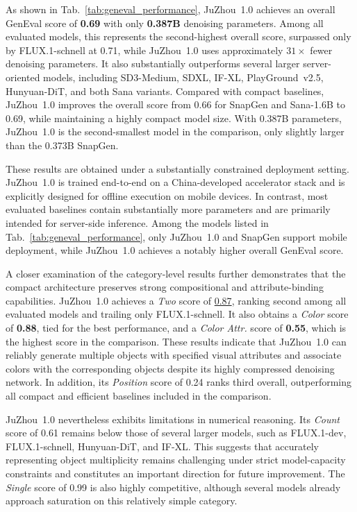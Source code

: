 As shown in Tab.~\ref{tab:geneval_performance}, JuZhou~1.0 achieves an overall GenEval score of \textbf{0.69} with only \textbf{0.387B} denoising parameters. Among all evaluated models, this represents the second-highest overall score, surpassed only by FLUX.1-schnell at 0.71, while JuZhou~1.0 uses approximately $31\times$ fewer denoising parameters. It also substantially outperforms several larger server-oriented models, including SD3-Medium, SDXL, IF-XL, PlayGround~v2.5, Hunyuan-DiT, and both Sana variants. Compared with compact baselines, JuZhou~1.0 improves the overall score from 0.66 for SnapGen and Sana-1.6B to 0.69, while maintaining a highly compact model size. With 0.387B parameters, JuZhou~1.0 is the second-smallest model in the comparison, only slightly larger than the 0.373B SnapGen.

These results are obtained under a substantially constrained deployment setting. JuZhou~1.0 is trained end-to-end on a China-developed accelerator stack and is explicitly designed for offline execution on mobile devices. In contrast, most evaluated baselines contain substantially more parameters and are primarily intended for server-side inference. Among the models listed in Tab.~\ref{tab:geneval_performance}, only JuZhou~1.0 and SnapGen support mobile deployment, while JuZhou~1.0 achieves a notably higher overall GenEval score.

A closer examination of the category-level results further demonstrates that the compact architecture preserves strong compositional and attribute-binding capabilities. JuZhou~1.0 achieves a \textit{Two} score of \underline{0.87}, ranking second among all evaluated models and trailing only FLUX.1-schnell. It also obtains a \textit{Color} score of \textbf{0.88}, tied for the best performance, and a \textit{Color Attr.} score of \textbf{0.55}, which is the highest score in the comparison. These results indicate that JuZhou~1.0 can reliably generate multiple objects with specified visual attributes and associate colors with the corresponding objects despite its highly compressed denoising network. In addition, its \textit{Position} score of 0.24 ranks third overall, outperforming all compact and efficient baselines included in the comparison.

JuZhou~1.0 nevertheless exhibits limitations in numerical reasoning. Its \textit{Count} score of 0.61 remains below those of several larger models, such as FLUX.1-dev, FLUX.1-schnell, Hunyuan-DiT, and IF-XL. This suggests that accurately representing object multiplicity remains challenging under strict model-capacity constraints and constitutes an important direction for future improvement. The \textit{Single} score of 0.99 is also highly competitive, although several models already approach saturation on this relatively simple category.

